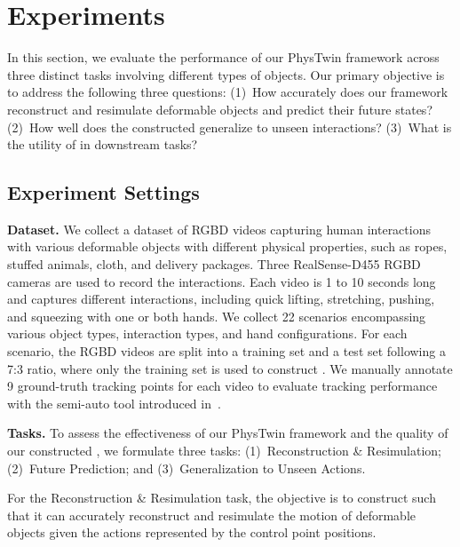 \section{Experiments}





In this section, we evaluate the performance of our PhysTwin framework across three distinct tasks involving different types of objects. Our primary objective is to address the following three questions:
(1)~How accurately does our framework reconstruct and resimulate deformable objects and predict their future states?  
(2)~How well does the constructed \ourabbr generalize to unseen interactions?
(3)~What is the utility of \ourabbr in downstream tasks?

\subsection{Experiment Settings}

\textbf{\indent Dataset.}
We collect a dataset of RGBD videos capturing human interactions with various deformable objects with different physical properties, such as ropes, stuffed animals, cloth, and delivery packages. Three RealSense-D455 RGBD cameras are used to record the interactions. 
Each video is 1 to 10 seconds long and captures different interactions, including quick lifting, stretching, pushing, and squeezing with one or both hands. 
We collect 22 scenarios encompassing various object types, interaction types, and hand configurations. For each scenario, the RGBD videos are split into a training set and a test set following a 7:3 ratio, where only the training set is used to construct \ourabbr. 
We manually annotate 9 ground-truth tracking points for each video to evaluate tracking performance with the semi-auto tool introduced in~\cite{doersch2023tapir}. 



\textbf{Tasks.}
To assess the effectiveness of our PhysTwin framework and the quality of our constructed \ourabbr, we formulate three tasks:  
(1)~Reconstruction \& Resimulation;  
(2)~Future Prediction; and 
(3)~Generalization to Unseen Actions.

For the Reconstruction \& Resimulation task, the objective is to construct \ourabbr such that it can accurately reconstruct and resimulate the motion of deformable objects given the actions represented by the control point positions. 

